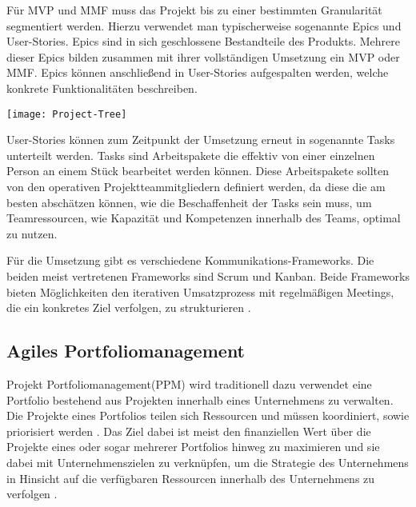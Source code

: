 Für MVP und MMF muss das Projekt bis zu einer bestimmten Granularität segmentiert werden. Hierzu verwendet man typischerweise sogenannte Epics und User-Stories. Epics sind in sich geschlossene Bestandteile des Produkts. Mehrere dieser Epics bilden zusammen mit ihrer vollständigen Umsetzung ein MVP oder MMF. Epics können anschließend in User-Stories aufgespalten werden, welche konkrete Funktionalitäten beschreiben. \cite{agilesProjektmanagementImBerufsalltagEpicsUndUserStories}

\vspace{20pt}
\begin{center}
    \begin{minipage}{0.8\linewidth}
        \texttt{[image: Project-Tree]}
    \end{minipage}
\end{center}
\vspace{20pt}

User-Stories können zum Zeitpunkt der Umsetzung erneut in sogenannte Tasks unterteilt werden. Tasks sind Arbeitspakete die effektiv von einer einzelnen Person an einem Stück bearbeitet werden können. Diese Arbeitspakete sollten von den operativen Projektteammitgliedern definiert werden, da diese die am besten abschätzen können, wie die Beschaffenheit der Tasks sein muss, um Teamressourcen, wie Kapazität und Kompetenzen innerhalb des Teams, optimal zu nutzen. \cite{agilesProjektmanagementImBerufsalltagEpicsUndUserStories}

Für die Umsetzung gibt es verschiedene Kommunikations-Frameworks. Die beiden meist vertretenen Frameworks sind Scrum und Kanban. Beide Frameworks bieten Möglichkeiten den iterativen Umsatzprozess mit regelmäßigen Meetings, die ein konkretes Ziel verfolgen, zu strukturieren \cite{}.

\subsection{Agiles Portfoliomanagement}
Projekt Portfoliomanagement(PPM) wird traditionell dazu verwendet eine Portfolio bestehend aus Projekten innerhalb eines Unternehmens zu verwalten. Die Projekte eines Portfolios teilen sich Ressourcen und müssen koordiniert, sowie priorisiert werden \cite{NGUYEN20181054}.
Das Ziel dabei ist meist den finanziellen Wert über die Projekte eines oder sogar mehrerer Portfolios hinweg zu maximieren und sie dabei mit Unternehmenszielen zu verknüpfen, um die Strategie des Unternehmens in Hinsicht auf die verfügbaren Ressourcen innerhalb des Unternehmens zu verfolgen \cite{MARTINSUO200756}.

